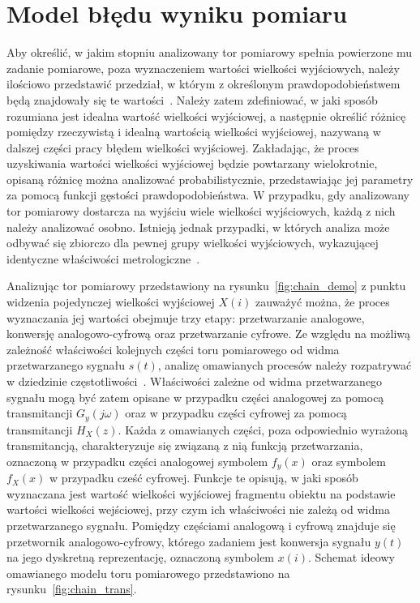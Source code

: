\chapter{Model błędu wyniku pomiaru}

Aby określić, w jakim stopniu analizowany tor pomiarowy spełnia powierzone mu zadanie pomiarowe, poza wyznaczeniem wartości wielkości wyjściowych, należy ilościowo przedstawić przedział, w którym z określonym prawdopodobieństwem będą znajdowały się te wartości~\cite{jcgm_guide}. Należy zatem zdefiniować, w jaki sposób rozumiana jest idealna wartość wielkości wyjściowej, a następnie określić różnicę pomiędzy rzeczywistą i idealną wartością wielkości wyjściowej, nazywaną w dalszej części pracy błędem wielkości wyjściowej. Zakładając, że proces uzyskiwania wartości wielkości wyjściowej będzie powtarzany wielokrotnie, opisaną różnicę można analizować probabilistycznie, przedstawiając jej parametry za pomocą funkcji gęstości prawdopodobieństwa. W przypadku, gdy analizowany tor pomiarowy dostarcza na wyjściu wiele wielkości wyjściowych, każdą z nich należy analizować osobno. Istnieją jednak przypadki, w których analiza może odbywać się zbiorczo dla pewnej grupy wielkości wyjściowych, wykazującej identyczne właściwości metrologiczne~\cite{auth_electronics}.

Analizując tor pomiarowy przedstawiony na rysunku~\ref{fig:chain_demo} z punktu widzenia pojedynczej wielkości wyjściowej $X(i)$ zauważyć można, że proces wyznaczania jej wartości obejmuje trzy etapy: przetwarzanie analogowe, konwersję analogowo-cyfrową oraz przetwarzanie cyfrowe. Ze względu na możliwą zależność właściwości kolejnych części toru pomiarowego od widma przetwarzanego sygnału $s(t)$, analizę omawianych procesów należy rozpatrywać w dziedzinie częstotliwości~\cite{jakubiec_system}. Właściwości zależne od widma przetwarzanego sygnału mogą być zatem opisane w przypadku części analogowej za pomocą transmitancji $G_{y}(j\omega)$ oraz w przypadku części cyfrowej za pomocą transmitancji $H_{X}(z)$. Każda z omawianych części, poza odpowiednio wyrażoną transmitancją, charakteryzuje się związaną z nią funkcją przetwarzania, oznaczoną w przypadku części analogowej symbolem $f_{y}(x)$ oraz symbolem $f_{X}(x)$ w przypadku cześć cyfrowej. Funkcje te opisują, w jaki sposób wyznaczana jest wartość wielkości wyjściowej fragmentu obiektu na podstawie wartości wielkości wejściowej, przy czym ich właściwości nie zależą od widma przetwarzanego sygnału. Pomiędzy częściami analogową i cyfrową znajduje się przetwornik analogowo-cyfrowy, którego zadaniem jest konwersja sygnału $y(t)$ na jego dyskretną reprezentację, oznaczoną symbolem $x(i)$. Schemat ideowy omawianego modelu toru pomiarowego przedstawiono na rysunku~\ref{fig:chain_trans}.

